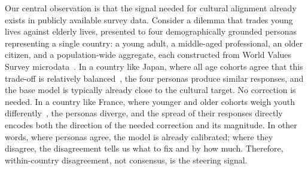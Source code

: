 \documentclass{article}
\begin{document}

Our central observation is that the signal needed for cultural alignment already exists in publicly available survey data. Consider a dilemma that trades young lives against elderly lives, presented to four demographically grounded personas representing a single country: a young adult, a middle-aged professional, an older citizen, and a population-wide aggregate, each constructed from World Values Survey microdata~\citep{haerpfer2022wvs}. In a country like Japan, where all age cohorts agree that this trade-off is relatively balanced~\citep{awad2018moral}, the four personas produce similar responses, and the base model is typically already close to the cultural target. No correction is needed. In a country like France, where younger and older cohorts weigh youth differently~\citep{awad2018moral, inglehart2005modernization}, the personas diverge, and the spread of their responses directly encodes both the direction of the needed correction and its magnitude. In other words, where personas agree, the model is already calibrated; where they disagree, the disagreement tells us what to fix and by how much. Therefore, within-country disagreement, not consensus, is the steering signal.
\end{document}
